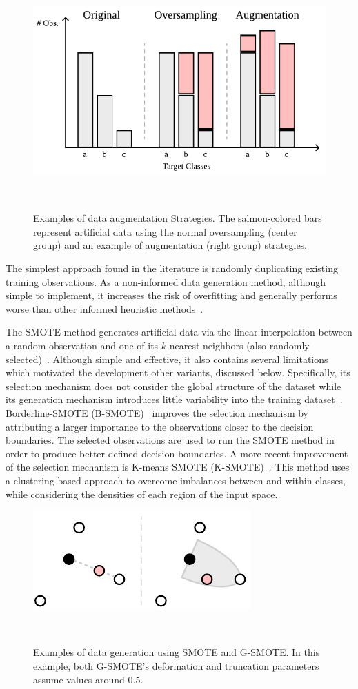 \begin{figure}[ht]
	\centering
	\includegraphics[width=.6\linewidth]{augmentation_strategies}
    \caption[Examples of data augmentation Strategies.]{%
        Examples of data augmentation Strategies. The salmon-colored bars
        represent artificial data using the normal oversampling (center group) and
        an example of augmentation (right group) strategies.
    }~\label{fig:augmentation_strategies}
\end{figure}

The simplest approach found in the literature is randomly duplicating existing
training observations. As a non-informed data generation method, although
simple to implement, it increases the risk of overfitting and generally
performs worse than other informed heuristic
methods~\cite{Douzas2019rs}.

The SMOTE method generates artificial data via the linear interpolation
between a random observation and one of its $k$-nearest neighbors (also
randomly selected)~\cite{Chawla2002}. Although simple and effective, it also
contains several limitations which motivated the development other variants,
discussed below. Specifically, its selection mechanism does not consider the
global structure of the dataset while its generation mechanism introduces
little variability into the training dataset~\cite{Douzas2019}.
Borderline-SMOTE (B-SMOTE)~\cite{Han2005} improves the selection mechanism by
attributing a larger importance to the observations closer to the decision
boundaries. The selected observations are used to run the SMOTE method in
order to produce better defined decision boundaries. A more recent improvement
of the selection mechanism is K-means SMOTE (K-SMOTE)~\cite{Douzas2018}. This
method uses a clustering-based approach to overcome imbalances between and
within classes, while considering the densities of each region of the input
space.

\begin{figure}[ht]
	\centering
	\includegraphics[width=.4\linewidth]{smote_vs_gsmote}
    \caption[Examples of data generation using SMOTE and G-SMOTE\@.]{%
        Examples of data generation using SMOTE and G-SMOTE\@. In this
        example, both G-SMOTE's deformation and truncation parameters assume
        values around $0.5$.
    }~\label{fig:smote_vs_gsmote}
\end{figure}

